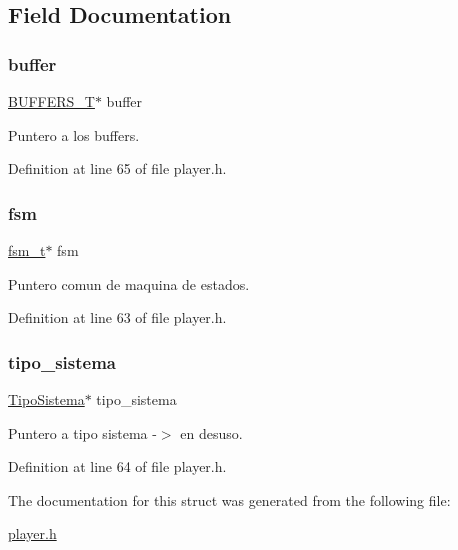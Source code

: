 \subsection{Field Documentation}
\mbox{\label{structfsm__audio__controller_a395b225759de943e9aba55fac03923e6}} 
\subsubsection{\texorpdfstring{buffer}{buffer}}
{\footnotesize\ttfamily \mbox{\hyperlink{player_8h_a60a77fbaea5edcaf4415b0adad33f411}{B\+U\+F\+F\+E\+R\+S\+\_\+T}}$\ast$ buffer}



Puntero a los buffers. 



Definition at line 65 of file player.\+h.

\mbox{\label{structfsm__audio__controller_ac266ea0b7c96d1a0656ed46a9d3add6e}} 
\subsubsection{\texorpdfstring{fsm}{fsm}}
{\footnotesize\ttfamily \mbox{\hyperlink{fsm_8h_ac7a7d1813cdcb9d4c76f575416188504}{fsm\+\_\+t}}$\ast$ fsm}



Puntero comun de maquina de estados. 



Definition at line 63 of file player.\+h.

\mbox{\label{structfsm__audio__controller_a175991a577a3d507cc6f48adef71ef4e}} 
\subsubsection{\texorpdfstring{tipo\+\_\+sistema}{tipo\_sistema}}
{\footnotesize\ttfamily \mbox{\hyperlink{struct_tipo_sistema}{Tipo\+Sistema}}$\ast$ tipo\+\_\+sistema}



Puntero a tipo sistema -\/$>$ en desuso. 



Definition at line 64 of file player.\+h.



The documentation for this struct was generated from the following file\+:\begin{DoxyCompactItemize}
\item 
\mbox{\hyperlink{player_8h}{player.\+h}}\end{DoxyCompactItemize}
